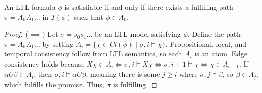 \begin{theorem}
\label{thm:fulfilling-path}
An LTL formula $\phi$ is satisfiable if and only if there exists a fulfilling path $\pi = A_0 A_1 \dots$ in $T(\phi)$ such that $\phi \in A_0$.
\end{theorem}
\begin{proof}
($\implies$) Let $\sigma = s_0 s_1 \dots$ be an LTL model satisfying $\phi$. Define the path $\pi = A_0 A_1 \dots$ by setting $A_i = \{ \chi \in Cl(\phi) \mid \sigma, i \models \chi \}$. 
Propositional, local, and temporal consistency follow from LTL semantics, so each $A_i$ is an atom. Edge consistency holds because $X\chi \in A_i \iff \sigma, i \models X\chi \iff \sigma, i+1 \models \chi \iff \chi \in A_{i+1}$.
If $\alpha U \beta \in A_i$, then $\sigma, i \models \alpha U \beta$, meaning there is some $j \ge i$ where $\sigma, j \models \beta$, so $\beta \in A_j$, which fulfills the promise. Thus, $\pi$ is fulfilling.


\end{proof}
